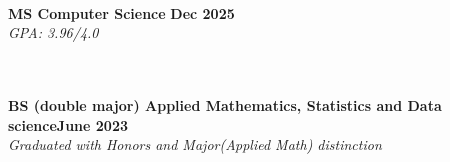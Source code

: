  \\

\textbf{MS Computer Science }\hfill \textbf{Dec 2025}  \\
\textit{GPA: 3.96/4.0}\strut \\


\vspace{7pt}
\\

\textbf{BS (double major) Applied Mathematics, Statistics and Data science}\hfill \textbf{June 2023} \\

\textit{Graduated with Honors and Major(Applied Math) distinction}\strut \hfill \\




